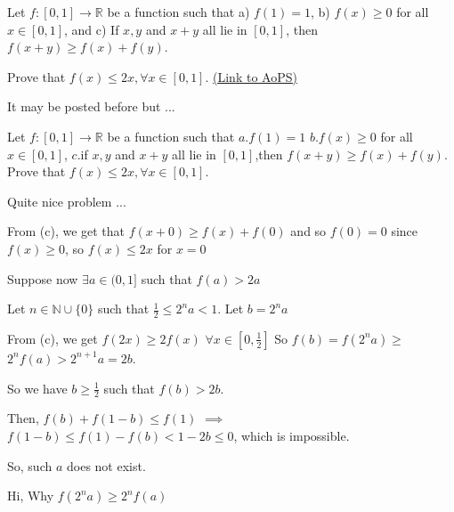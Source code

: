 \begin{problem}
	Let $ f: [0,1]\rightarrow \mathbb{R}$ be a function such that 
a) $ f(1)=1$,
b) $ f(x)\geq 0$ for all $ x\in [0,1]$, and
c) If $ x,y$ and $ x+y$ all lie in $ [0,1]$, then $ f(x+y)\geq f(x)+f(y)$.

Prove that $ f(x)\leq 2x , \forall x\in [0,1].$
	\flushright \href{https://artofproblemsolving.com/community/c6h273514}{(Link to AoPS)}
\end{problem}



\begin{solution}
	\begin{tcolorbox}It may be posted before but ...

Let $ f: [0,1]\rightarrow \mathbb{R}$ be a function such that 
$ a. f(1) = 1$
$ b.f(x)\geq 0$ for all $ x\in [0,1]$,
$ c.$if $ x,y$ and $ x + y$ all lie in $ [0,1]$,then $ f(x + y)\geq f(x) + f(y)$.
Prove that $ f(x)\leq 2x , \forall x\in [0,1].$\end{tcolorbox}

Quite nice problem ...

From (c), we get that $ f(x+0)\geq f(x)+f(0)$ and so $ f(0)=0$ since $ f(x)\geq 0$, so $ f(x)\leq 2x$ for $ x=0$

Suppose now $ \exists a\in (0,1]$ such that $ f(a)>2a$

Let $ n\in\mathbb{N}\cup\{0\}$ such that $ \frac{1}{2}\leq 2^na < 1$. Let $ b=2^na$

From (c), we get $ f(2x)\geq 2f(x)$ $ \forall x\in[0,\frac{1}{2}]$ So $ f(b)=f(2^na)\geq$ $ 2^nf(a)>2^{n+1}a=2b$.

So we have $ b\geq\frac{1}{2}$ such that $ f(b)>2b$.

Then, $ f(b)+f(1-b)\leq f(1)$ $ \implies$ $ f(1-b)\leq f(1)-f(b) < 1 - 2b \leq 0$, which is impossible.

So, such $ a$ does not exist.
\end{solution}



\begin{solution}
	Hi,
Why $ f(2^{n}a)\geq 2^{n}f(a)$
\end{solution}



